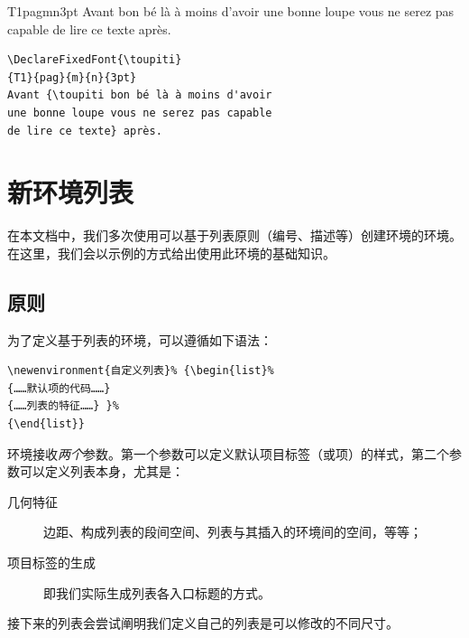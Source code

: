 \begin{codelist}[9.15]{
\DeclareFixedFont{\toupiti}
{T1}{pag}{m}{n}{3pt}
Avant {\toupiti bon bé là à moins d'avoir
une bonne loupe vous ne serez pas capable
de lire ce texte} après.
}
\begin{verbatim}
\DeclareFixedFont{\toupiti}
{T1}{pag}{m}{n}{3pt}
Avant {\toupiti bon bé là à moins d'avoir
une bonne loupe vous ne serez pas capable
de lire ce texte} après.\end{verbatim}
\end{codelist}

\section{新环境列表}

在本文档中，我们多次使用可以基于列表原则（编号、描述等）创建环境的环境。在这里，我们会以示例的方式给出使用此环境的基础知识。

\subsection{原则}

为了定义基于列表的环境，可以遵循如下语法：

\begin{dmd}
\begin{verbatim}
\newenvironment{自定义列表}% {\begin{list}%
{……默认项的代码……}
{……列表的特征……} }%
{\end{list}}\end{verbatim}
\end{dmd}

环境接收\emph{两个}参数。第一个参数可以定义默认项目标签（或项）的样式，第二个参数可以定义列表本身，尤其是：

\begin{description}
    \item[几何特征] 边距、构成列表的段间空间、列表与其插入的环境间的空间，等等；
    \item[项目标签的生成] 即我们实际生成列表各入口标题的方式。
\end{description}

接下来的列表会尝试阐明我们定义自己的列表是可以修改的不同尺寸。

\newenvironment{listetest}{\begin{list}{}{%
    \setlength{\labelwidth}{70pt}%
    \setlength{\labelsep}{30pt}%
    \setlength{\itemindent}{15pt}%
    \setlength{\leftmargin}{100pt}%
    \setlength{\rightmargin}{10pt}%
    \setlength{\listparindent}{20pt}%
    \renewcommand{\makelabel}[1]{\textsf{##1}}
  }
}
{\end{list}}

